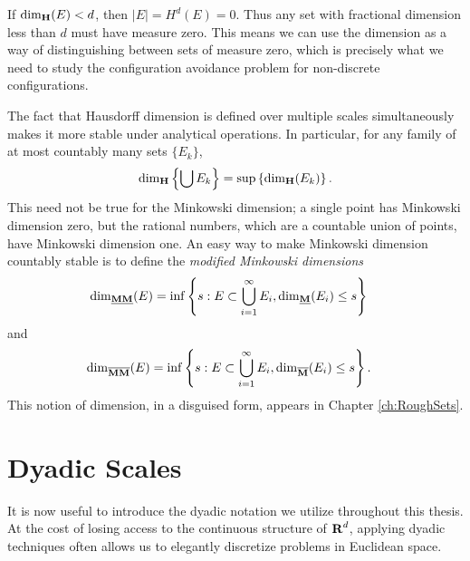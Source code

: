 \begin{remark}
	If $\operatorname{\dim_{\mathbf{H}}}(E) < d$, then $|E| = H^d(E) = 0$. Thus any set with fractional dimension less than $d$ must have measure zero. This means we can use the dimension as a way of distinguishing between sets of measure zero, which is precisely what we need to study the configuration avoidance problem for non-discrete configurations.
\end{remark}

The fact that Hausdorff dimension is defined over multiple scales simultaneously makes it more stable under analytical operations. In particular, for any family of at most countably many sets $\{ E_k \}$,
%
\[ \operatorname{\dim_{\mathbf{H}}} \left\{ \bigcup E_k \right\} = \sup \left\{ \operatorname{\dim_{\mathbf{H}}}(E_k) \right\}. \]
%
This need not be true for the Minkowski dimension; a single point has Minkowski dimension zero, but the rational numbers, which are a countable union of points, have Minkowski dimension one. An easy way to make Minkowski dimension countably stable is to define the \emph{modified Minkowski dimensions}
%
\begin{align*}
	\operatorname{\dim_{\underline{\mathbf{MM}}}}(E) &= \inf \left\{ s : E \subset \bigcup_{i = 1}^\infty E_i, \operatorname{\dim_{\underline{\mathbf{M}}}}(E_i) \leq s \right\}
\end{align*}
%
and
%
\begin{align*}
	\operatorname{\dim_{\overline{\mathbf{MM}}}}(E) &= \inf \left\{ s : E \subset \bigcup_{i = 1}^\infty E_i, \operatorname{\dim_{\overline{\mathbf{M}}}}(E_i) \leq s \right\}.
\end{align*}
%
This notion of dimension, in a disguised form, appears in Chapter \ref{ch:RoughSets}.







\section{Dyadic Scales} \label{sec:Dyadics}

It is now useful to introduce the dyadic notation we utilize throughout this thesis. At the cost of losing access to the continuous structure of $\operatorname{\mathbf{R}}^d$, applying dyadic techniques often allows us to elegantly discretize problems in Euclidean space.

